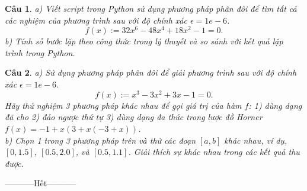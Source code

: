 \documentclass[11pt]{article}
\newtheorem{bt}{Câu}
\begin{document}
\begin{bt}
a) Viết script trong Python sử dụng phương pháp phân đôi để tìm tất cả các nghiệm của phương trình sau với độ chính xác $\epsilon=1e-6$.
\[ f(x) := 32x^6 - 48x^4 +18x^2 - 1 = 0.  \] 
b) Tính số bước lặp theo công thức trong lý thuyết và so sánh với kết quả lập trình trong Python.
\end{bt}

\begin{bt} %
a) Sử dụng phương pháp phân đôi để giải phương trình sau với độ chính xác $\epsilon=1e-6$. 
%
\[ f(x) := x^3-3x^2+3x-1 = 0. \]
%
Hãy thử nghiệm 3 phương pháp khác nhau để gọi giá trị của hàm $f$: 1) dùng dạng đã cho 2) đảo ngược thứ tự 3) dùng dạng đa thức trong lược đồ Horner $f(x) = -1+x(3+x(-3+x))$. \\
b) Chọn 1 trong 3 phương pháp trên và thử các đoạn $[a,b]$ khác nhau, ví dụ, $[0, 1.5]$, $[0.5, 2.0]$, và $[0.5, 1.1]$. Giải thích sự khác nhau trong các kết quả thu được. 
\end{bt}

\centerline{-----------Hết-----------}

% 
   
\end{document}
